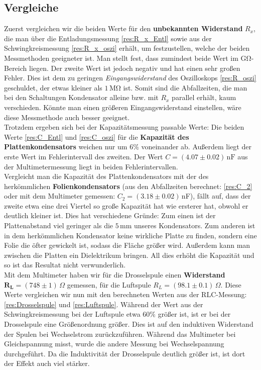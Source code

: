\documentclass[12pt,a4paper,titlepage,headinclude,bibtotoc]{scrartcl}
\begin{document}
\subsection{Vergleiche}
Zuerst vergleichen wir die beiden Werte für den \textbf{unbekannten Widerstand} $R_x$, die man über die Entladungsmessung \eqref{res:R_x_Entl} sowie aus der Schwingkreismessung \eqref{res:R_x_oszi} erhält, um festzustellen, welche der beiden Messmethoden geeigneter ist.
Man stellt fest, dass zumindest beide Wert im $\si{\giga\ohm}$-Bereich liegen.
Der zweite Wert ist jedoch negativ und hat einen sehr großen Fehler.
Dies ist dem zu geringen \textit{Eingangswiderstand} des Oszilloskops \eqref{res:R_oszi} geschuldet, der etwas kleiner als $1\,\si{\mega\ohm}$ ist.
Somit sind die Abfallzeiten, die man bei den Schaltungen Kondensator alleine bzw. mit $R_x$ parallel erhält, kaum verschieden.
Könnte man einen größeren Eingangswiderstand einstellen, wäre diese Messmethode auch besser geeignet.\\
Trotzdem ergeben sich bei der Kapazitätsmessung passable Werte: Die beiden Werte \eqref{res:C_Entl} und \eqref{res:C_oszi} für die \textbf{Kapazität des Plattenkondensators} weichen nur um $6\%$ voneinander ab.
Außerdem liegt der erste Wert im Fehlerintervall des zweiten.
Der Wert $C=(4.07 \pm 0.02) \,\si{\nano\farad}$ aus der Multimetermessung liegt in beiden Fehlerintervallen.\\

Vergleicht man die Kapazität des Plattenkondensators mit der des herkömmlichen \textbf{Folienkondensators} (aus den Abfallzeiten berechnet: \eqref{res:C_2} oder mit dem Multimeter gemessen: $C_2=(3.18\pm 0.02)\,$nF), fällt auf, dass der zweite etwa eine drei Viertel so große Kapazität hat wie ersterer hat, obwohl er deutlich kleiner ist.
Dies hat verschiedene Gründe: Zum einen ist der Plattenabstand viel geringer als die $5\,$mm unseres Kondensators.
Zum anderen ist in dem herkömmlichen Kondensator keine wirkliche Platte zu finden, sondern eine Folie die öfter gewickelt ist, sodass die Fläche größer wird.
Außerdem kann man zwischen die Platten ein Dielektrikum bringen.
All dies erhöht die Kapazität und so ist das Resultat nicht verwunderlich.\\

Mit dem Multimeter haben wir für die Drosselspule einen \textbf{Widerstand} $\mathbf{R_L}=(748\pm 1)\,\Omega$ gemessen, für die Luftspule $R_L=(98.1\pm 0.1)\,\Omega$.
Diese Werte vergleichen wir nun mit den berechneten Werten aus der RLC-Messung: \eqref{res:Drosselspule} und \eqref{res:Luftspule}.
Während der Wert aus der Schwingkreismessung bei der Luftspule etwa $60\%$ größer ist, ist er bei der Drosselspule eine Größenordnung größer.
Dies ist auf den induktiven Widerstand der Spulen bei Wechselstrom zurückzuführen.
Während das Multimeter bei Gleichspannung misst, wurde die andere Messung bei Wechselspannung durchgeführt.
Da die Induktivität der Drosselspule deutlich größer ist, ist dort der Effekt auch viel stärker.\\
\end{document}
